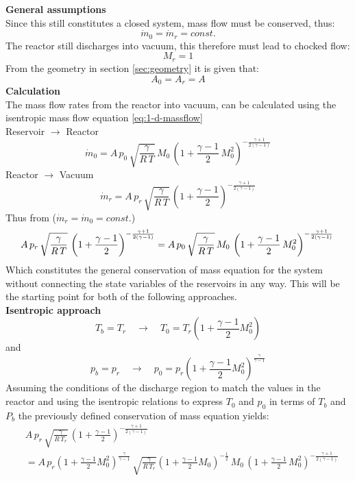 	\textbf{General assumptions}\\
		Since this still constitutes a closed system, mass flow must be conserved, thus:
		$$
			\dot{m}_0 = \dot{m}_r = const.
		$$
		The reactor still discharges into vacuum, this therefore must lead to chocked flow:
		$$
			M_r = 1
		$$
		From the geometry in section \ref{sec:geometry} it is given that:
		$$
			A_0 = A_r = A
		$$
	\textbf{Calculation}\\
		The mass flow rates from the reactor into vacuum, can be calculated using the isentropic mass flow equation \eqref{eq:1-d-massflow}\\
		Reservoir $\to$ Reactor
		\begin{equation}
			\dot{m}_0 = A\, p_0\, \sqrt{\frac{\gamma}{R\,T}}\, M_0\,\left(1+\frac{\gamma-1}{2}\,M_0^2\right)^{-\frac{\gamma+1}{2(\gamma-1)}}
		\end{equation}\label{eq:massflow-inlet}
		Reactor $\to$ Vacuum
		\begin{equation}
			\dot{m}_r = A\, p_r\, \sqrt{\frac{\gamma}{R\,T}}\,\left(1+\frac{\gamma-1}{2}\right)^{-\frac{\gamma+1}{2(\gamma-1)}}
		\end{equation}\label{eq:massflow-outlet}
		Thus from ($\dot{m}_r = \dot{m}_0 = const.$)
		$$
			A\, p_r\, \sqrt{\frac{\gamma}{R\,T}}\,\left(1+\frac{\gamma-1}{2}\right)^{-\frac{\gamma+1}{2(\gamma-1)}}
			=  A\, p_0\, \sqrt{\frac{\gamma}{R\,T}}\, M_0\,\left(1+\frac{\gamma-1}{2}\,M_0^2\right)^{-\frac{\gamma+1}{2(\gamma-1)}}\\\\
		$$
		Which constitutes the general conservation of mass equation for the system without connecting the state variables of the reservoirs in any way.
		This will be the starting point for both of the following approaches.\\
	\textbf{Isentropic approach}\\
		$$
			T_b = T_r
			\quad \to \quad
			T_0 = T_r \left(1 + \frac{\gamma - 1}{2}M_0^2 \right)
		$$
		and
		$$
			p_b = p_r
			\quad \to \quad
			p_0 = p_r \left(1 + \frac{\gamma - 1}{2}M_0^2 \right)^{\frac{\gamma}{\gamma - 1}}
		$$
		Assuming the conditions of the discharge region to match the values in the reactor and using the isentropic relations to express $T_0$ and $p_0$ in terms of $T_b$ and $P_b$ the previously defined conservation of mass equation yields:
		\begin{align*}
			&A\, p_r\, \sqrt{\frac{\gamma}{R\,T_r}}\,\left(1+\frac{\gamma-1}{2}\right)^{-\frac{\gamma+1}{2(\gamma-1)}}\\
			&= A\, p_r\left(1 + \frac{\gamma - 1}{2}M_0^2\right)^{\frac{\gamma}{\gamma-1}}\, \sqrt{\frac{\gamma}{R\,T_r}}\left(1 + \frac{\gamma - 1}{2}M_0\right)^{-\frac{1}{2}}\, M_0\,\left(1+\frac{\gamma-1}{2}\,M_0^2\right)^{-\frac{\gamma+1}{2(\gamma-1)}}\\\\
		\end{align*}
